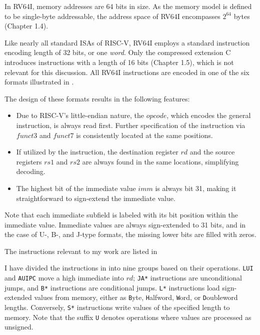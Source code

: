 In RV64I, memory addresses are 64 bits in size. As the memory model is defined
to be single-byte addressable, the address space of RV64I encompasses $2^{64}$
bytes \cite{riscv-isa}(Chapter 1.4).

Like nearly all standard ISAs of RISC-V, RV64I employs a standard instruction
encoding length of 32 bits, or one \emph{word}. Only the compressed extension C
introduces instructions with a length of 16 bits \cite{riscv-isa}(Chapter 1.5),
which is not relevant for this discussion. All RV64I instructions are encoded
in one of the six formats illustrated in .



The design of these formats results in the following features:
\begin{itemize}
      \item Due to RISC-V's little-endian nature, the $opcode$, which encodes the general
            instruction, is always read first. Further specification of the instruction via
            $funct3$ and $funct7$ is consistently located at the same positions.
      \item If utilized by the instruction, the destination register $rd$ and the source
            registers $rs1$ and $rs2$ are always found in the same locations, simplifying
            decoding.
      \item The highest bit of the immediate value $imm$ is always bit 31, making it
            straightforward to sign-extend the immediate value.
\end{itemize}
Note that each immediate subfield is labeled with its bit position within the immediate value.
Immediate values are always sign-extended to 31 bits, and in the case of U-, B-, and J-type formats, the missing lower bits are filled with zeros.

The instructions relevant to my work are listed in

I have divided the instructions in  into nine
groups based on their operations. \texttt{LUI} and \texttt{AUIPC} move a high
immediate into $rd$; \texttt{JA*} instructions are unconditional jumps, and
\texttt{B*} instructions are conditional jumps. \texttt{L*} instructions load
sign-extended values from memory, either as \texttt{B}yte, \texttt{H}alfword,
\texttt{W}ord, or \texttt{D}oubleword lengths. Conversely, \texttt{S*}
instructions write values of the specified length to memory. 
Note that the suffix \texttt{U} denotes operations where values are processed
as unsigned.

